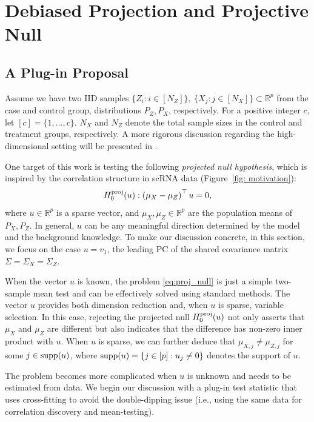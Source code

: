 \documentclass[11pt]{article}
\begin{document}
\section{Debiased Projection and Projective Null}\label{section: debiased}

\subsection{A Plug-in Proposal}\label{section: plug-in test}

Assume we have two IID samples $\{Z_i: i \in [N_Z]\},~\{X_j: j \in [N_X]\}\subset \mathbb{R}^p$ from the case and control group, distributions $P_Z, P_X$, respectively. For a positive integer $c$, let $[c] = \{1,..., c\}$. $N_X$ and $N_Z$ denote the total sample sizes in the control and treatment groups, respectively. A more rigorous discussion regarding the high-dimensional setting will be presented in .

One target of this work is testing the following \emph{projected null hypothesis}, which is inspired by the correlation structure in scRNA data (Figure~\ref{fig: motivation}):
\begin{equation}\label{eq:proj_null}
H_0^{\rm proj}(u):\left(\mu_X-\mu_Z\right)^{\top} u=0,
\end{equation}
where $u\in\mathbb{R}^p$ is a sparse vector, and $\mu_X, \mu_Z \in \mathbb{R}^p$ are the population means of $P_X, P_Z$. In general, $u$ can be any meaningful direction determined by the model and the background knowledge. To make our discussion concrete, in this section, we focus on the case $u=v_1$, the leading PC of the shared covariance matrix $\Sigma=\Sigma_X=\Sigma_Z$.

When the vector $u$ is known, the problem \eqref{eq:proj_null} is just a simple two-sample mean test and can be effectively solved using standard methods. The vector $u$ provides both dimension reduction and, when $u$ is sparse, variable selection. In this case, rejecting the projected null $H_0^{\rm proj}(u)$ not only asserts that $\mu_X$ and $\mu_Z$ are different but also indicates that the difference has non-zero inner product with $u$. When $u$ is sparse, we can further deduce that $\mu_{X,j}\neq\mu_{Z,j}$ for some $j\in{\rm supp}(u)$, where ${\rm supp}(u)=\{j\in[p]:u_j\neq 0\}$ denotes the support of $u$.

The problem becomes more complicated when $u$ is unknown and needs to be estimated from data. 
We begin our discussion with a plug-in test statistic that uses cross-fitting to avoid the double-dipping issue (i.e., using the same data for correlation discovery and mean-testing).
\end{document}

